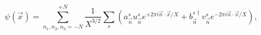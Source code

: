 \begin{equation}
\label{field}
\psi({\vec x}) = \sum_{n_1,n_2,n_3=-N}^{+N} \frac{1}{X^{3/2}} \sum_s
\left(a^s_{\vec n} u^s_{\vec n} e^{+2\pi i{\vec n}\cdot{\vec x}/X} +
b^{s\dagger}_{\vec n} v^s_{\vec n} e^{-2\pi i {\vec n}\cdot{\vec x}/X} 
\right),
\end{equation}

